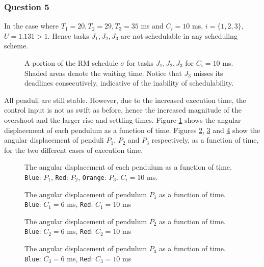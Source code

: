 \subsubsection{Question 5}
In the case where $T_1 = 20, T_2 = 29, T_3 = 35$ ms and $C_i = 10$ ms,
$i=\{1,2,3\}$, $U=1.131 > 1$. Hence tasks $J_1, J_2, J_3$ are not schedulable
in any scheduling scheme.


\begin{figure}[H]\centering
  \scalebox{0.7}{}
  \caption{A portion of the RM schedule $\sigma$ for tasks $J_1, J_2, J_3$ for
    $C_i = 10$ ms.  Shaded areas denote the waiting time. Notice that $J_3$
    misses its deadlines consecutively, indicative of the inability of
    schedulability.}
\end{figure}

All penduli are still stable. However, due to the increased execution time, the
control input is not as swift as before, hence the increased magnitude of the
overshoot and the larger rise and settling times.
Figure \ref{fig:5.2} shows the angular displacement of each pendulum as a
function of time.
Figures \ref{fig:5.6_10.1}, \ref{fig:5.6_10.2} and \ref{fig:5.6_10.3} show
the angular displacement of penduli $P_1$, $P_2$ and $P_3$ respectively, as a
function of time, for the two different cases of execution time.

\begin{figure}[H]\centering
  \scalebox{1}{}
  \caption{The angular displacement of each pendulum as a function of time.
    \texttt{Blue}: $P_1$, \texttt{Red}: $P_2$, \texttt{Orange}: $P_3$.
    $C_i = 10$ ms.}
  \label{fig:5.2}
\end{figure}

\begin{figure}[H]\centering
  \scalebox{1}{}
  \caption{The angular displacement of pendulum $P_1$ as a function of time.
    \texttt{Blue}: $C_1 = 6$ ms, \texttt{Red}: $C_1 = 10$ ms}
  \label{fig:5.6_10.1}
\end{figure}

\begin{figure}[H]\centering
  \scalebox{1}{}
  \caption{The angular displacement of pendulum $P_2$ as a function of time.
    \texttt{Blue}: $C_2 = 6$ ms, \texttt{Red}: $C_2 = 10$ ms}
  \label{fig:5.6_10.2}
\end{figure}

\begin{figure}[H]\centering
  \scalebox{1}{}
  \caption{The angular displacement of pendulum $P_3$ as a function of time.
    \texttt{Blue}: $C_3 = 6$ ms, \texttt{Red}: $C_3 = 10$ ms}
  \label{fig:5.6_10.3}
\end{figure}

